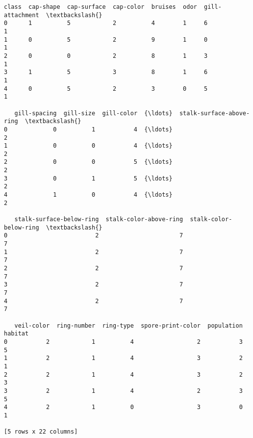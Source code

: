 \documentclass[11pt]{article}
\makeatletter
\newcommand{\boxspacing}{\kern\kvtcb@left@rule\kern\kvtcb@boxsep}
\newcommand{\prompt}[4]{
        {\ttfamily\llap{{\color{#2}[#3]:\hspace{3pt}#4}}\vspace{-\baselineskip}}
    }
\makeatother
\begin{document}
            \begin{tcolorbox}[breakable, size=fbox, boxrule=.5pt, pad at break*=1mm, opacityfill=0]
\prompt{Out}{outcolor}{92}{\boxspacing}
\begin{Verbatim}[commandchars=\\\{\}]
   class  cap-shape  cap-surface  cap-color  bruises  odor  gill-attachment  \textbackslash{}
0      1          5            2          4        1     6                1
1      0          5            2          9        1     0                1
2      0          0            2          8        1     3                1
3      1          5            3          8        1     6                1
4      0          5            2          3        0     5                1

   gill-spacing  gill-size  gill-color  {\ldots}  stalk-surface-above-ring  \textbackslash{}
0             0          1           4  {\ldots}                         2
1             0          0           4  {\ldots}                         2
2             0          0           5  {\ldots}                         2
3             0          1           5  {\ldots}                         2
4             1          0           4  {\ldots}                         2

   stalk-surface-below-ring  stalk-color-above-ring  stalk-color-below-ring  \textbackslash{}
0                         2                       7                       7
1                         2                       7                       7
2                         2                       7                       7
3                         2                       7                       7
4                         2                       7                       7

   veil-color  ring-number  ring-type  spore-print-color  population  habitat
0           2            1          4                  2           3        5
1           2            1          4                  3           2        1
2           2            1          4                  3           2        3
3           2            1          4                  2           3        5
4           2            1          0                  3           0        1

[5 rows x 22 columns]
\end{Verbatim}
\end{tcolorbox}
        
\end{document}
